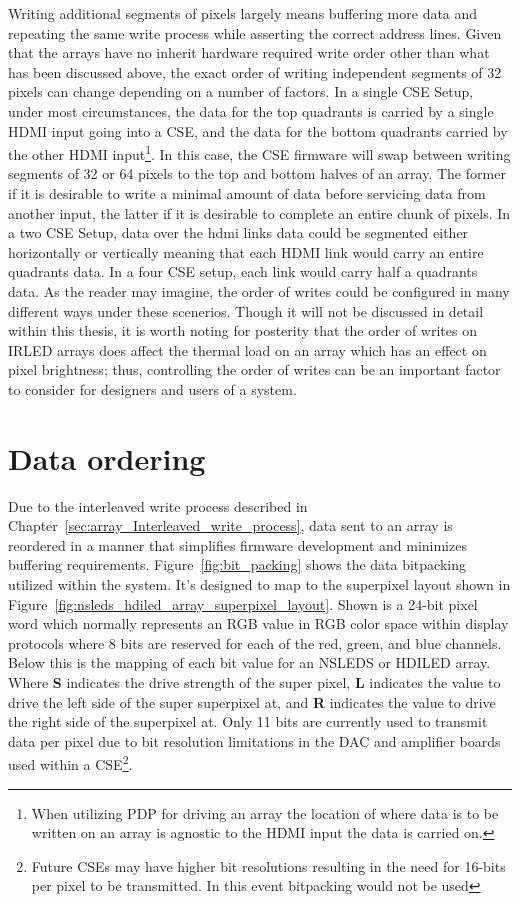     Writing additional segments of pixels largely means buffering more data and repeating the same write process while asserting the correct address lines. Given that the arrays have no inherit hardware required write order other than what has been discussed above, the exact order of writing independent segments of 32 pixels can change depending on a number of factors. In a single CSE Setup, under most circumstances, the data for the top quadrants is carried by a single HDMI input going into a CSE, and the data for the bottom quadrants carried by the other HDMI input\footnote{When utilizing PDP for driving an array the location of where data is to be written on an array is agnostic to the HDMI input the data is carried on.}. In this case, the CSE firmware will swap between writing segments of 32 or 64 pixels to the top and bottom halves of an array. The former if it is desirable to write a minimal amount of data before servicing data from another input, the latter if it is desirable to complete an entire chunk of pixels. In a two CSE Setup, data over the hdmi links data could be segmented either horizontally or vertically meaning that each HDMI link would carry an entire quadrants data. In a four CSE setup, each link would carry half a quadrants data. As the reader may imagine, the order of writes could be configured in many different ways under these scenerios. Though it will not be discussed in detail within this thesis, it is worth noting for posterity that the order of writes on IRLED arrays does affect the thermal load on an array which has an effect on pixel brightness\cite{BarakhshanEtAl2017, LaVeigneSieglinger2012, norton2}; thus, controlling the order of writes can be an important factor to consider for designers and users of a system.

\section{Data ordering}
    Due to the interleaved write process described in Chapter~\ref{sec:array_Interleaved_write_process}, data sent to an array is reordered in a manner that simplifies firmware development and minimizes buffering requirements. Figure~\ref{fig:bit_packing} shows the data bitpacking utilized within the system. It's designed to map to the superpixel layout shown in Figure~\ref{fig:nsleds_hdiled_array_superpixel_layout}. Shown is a 24-bit pixel word which normally represents an RGB value in RGB color space within display protocols where 8 bits are reserved for each of the red, green, and blue channels. Below this is the mapping of each bit value for an NSLEDS or HDILED array. Where \textbf{S} indicates the drive strength of the super pixel, \textbf{L} indicates the value to drive the left side of the super superpixel at, and \textbf{R} indicates the value to drive the right side of the superpixel at. Only 11 bits are currently used to transmit data per pixel due to bit resolution limitations in the DAC and amplifier boards used within a CSE\footnote{Future CSEs may have higher bit resolutions resulting in the need for 16-bits per pixel to be transmitted. In this event bitpacking would not be used}.

